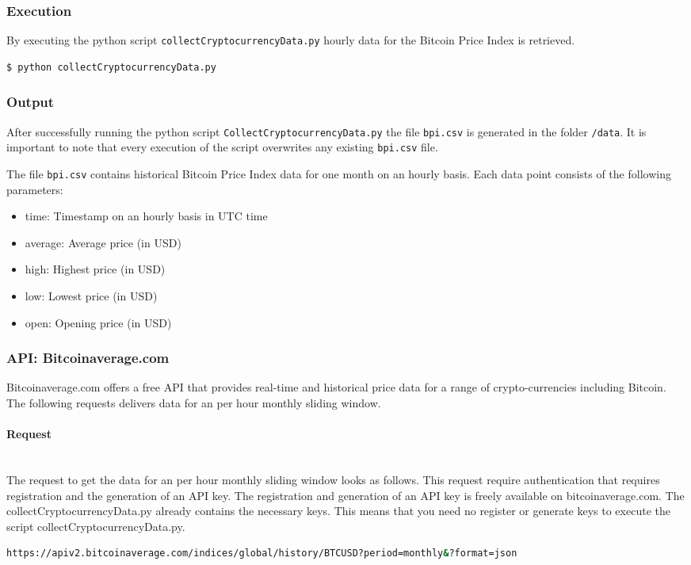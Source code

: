 \documentclass[a4paper,12pt]{article}
\begin{document}
\begin{spacing}{1.2}
\subsubsection{Execution}
By executing the python script \verb|collectCryptocurrencyData.py| hourly data for the Bitcoin Price Index is retrieved.
\begin{lstlisting}[language=bash]
    $ python collectCryptocurrencyData.py
\end{lstlisting}

\subsubsection{Output}
After successfully running the python script \verb|CollectCryptocurrencyData.py| the file \verb|bpi.csv| is generated in the folder \verb|/data|. It is important to note that every execution of the script overwrites any existing \verb|bpi.csv| file.

The file \verb|bpi.csv| contains historical Bitcoin Price Index data for one month on an hourly basis. Each data point consists of the following parameters:
\begin{itemize}
    \item time: Timestamp on an hourly basis in UTC time
    \item average: Average price (in USD)
    \item high: Highest price (in USD)
    \item low: Lowest price (in USD)
    \item open: Opening price (in USD)
\end{itemize}

\subsubsection{API: Bitcoinaverage.com}
Bitcoinaverage.com offers a free API that provides real-time and historical price data for a range of crypto-currencies including Bitcoin. The following requests delivers data for an per hour monthly sliding window.
\paragraph{Request}\mbox{}\\
The request to get the data for an per hour monthly sliding window looks as follows. This request require authentication that requires registration and the generation of an API key. The registration and generation of an API key is freely available on bitcoinaverage.com. The collectCryptocurrencyData.py already contains the necessary keys. This means that you need no register or generate keys to execute the script collectCryptocurrencyData.py.  
\begin{lstlisting}[language=bash]
https://apiv2.bitcoinaverage.com/indices/global/history/BTCUSD?period=monthly&?format=json
\end{lstlisting}

\end{spacing}
\end{document}
